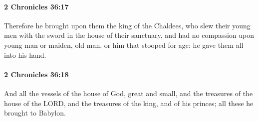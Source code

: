 		\paragraph{2 Chronicles 36:17} %
			\label{2CHRONICLES-36-17}

			Therefore he brought upon them the king of the Chaldees, who slew their young men with the sword in the house of their sanctuary, and had no compassion upon young man or maiden, old man, or him that stooped for age: he gave them all into his hand.


		\paragraph{2 Chronicles 36:18} %
			\label{2CHRONICLES-36-18}

			And all the vessels of the house of God, great and small, and the treasures of the house of the LORD, and the treasures of the king, and of his princes; all these he brought to Babylon.

